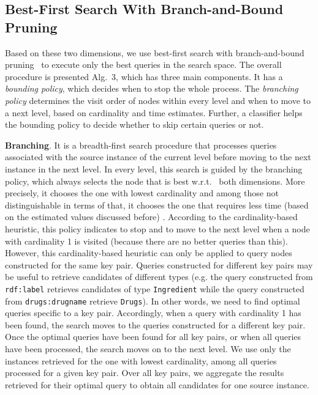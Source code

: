 \subsection{Best-First Search With Branch-and-Bound Pruning} 
Based on these two dimensions, we use best-first search with branch-and-bound pruning~\cite{DBLP:journals/jacm/DechterP85} to execute only the best queries in the search space. The overall procedure is presented Alg.~3, which has three main components. It has a \emph{bounding policy}, which decides when to stop the whole process. The \emph{branching policy} determines the visit order of nodes within every level and when to move to a next level, based on cardinality and time estimates. Further, a classifier helps the bounding policy to decide whether to skip certain queries or not. 

\textbf{Branching}. It is a breadth-first search procedure that processes queries associated with the source instance of the current level before moving to the next instance in the next level. In every level, this search is guided by the branching policy, which always selects the node that is best w.r.t.~ both dimensions. More precisely, it chooses the one with lowest cardinality and among those not distinguishable in terms of that, it chooses the one that requires less time (based on the estimated values discussed before) . According to the cardinality-based heuristic, this policy indicates to stop and to move to the next level when a node with cardinality 1 is visited (because there are no better queries than this). However, this cardinality-based heuristic can only be applied to query nodes constructed for the same key pair. Queries constructed for different key pairs may be useful to retrieve candidates of different types (e.g. the query constructed from \verb+rdf:label+ retrieves candidates of type \verb+Ingredient+ while the query constructed from \verb+drugs:drugname+ retrieve \verb+Drugs+). In other words, we need to find optimal queries specific to a key pair. Accordingly, when a query with cardinality 1 has been found, the search moves to the queries constructed for a different key pair. 
Once the optimal queries have been found for all key pairs, or when all queries have been processed, the search moves on to the next level. We use only the instances retrieved for the one with lowest cardinality, among all queries processed for a given key pair. Over all key pairs, we aggregate the results retrieved for their optimal query to obtain all candidates for one source instance. 
 

